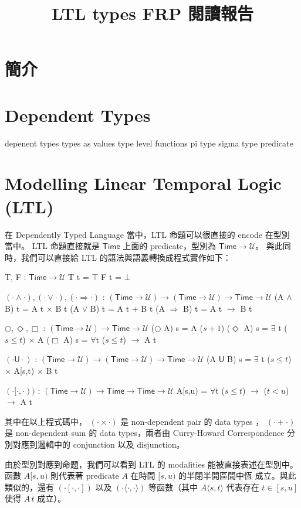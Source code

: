 \documentclass{article}
\newcommand{\Time}{\mathsf{Time}}
\newcommand{\TU}{\mathsf{U}}
\newcommand{\U}{\mathcal{U}}
\begin{document}
\title{LTL types FRP 閱讀報告}
\author{}
\date{}
\maketitle

\section{簡介}
\section{Dependent Types}
  depenent types
  types as values
  type level functions
  pi type
  sigma type
  predicate

\section{Modelling Linear Temporal Logic (LTL)}
  在 Dependently Typed Language 當中，LTL 命題可以很直接的 encode 在型別
  當中。 LTL 命題直接就是 $\Time$ 上面的 predicate，型別為 $\Time\to\U$。
  與此同時，我們可以直接給 LTL 的語法與語義轉換成程式實作如下：

  \begin{code}
  T, F : $\Time\to\U$
  T t = $\top$
  F t = $\bot$

  $(\cdot\land\cdot), (\cdot\lor\cdot), (\cdot\Rightarrow\cdot)$ : $(\Time\to\U)\to(\Time\to\U)\to\Time\to\U$
  (A $\land$ B) t = A t $\times$ B t
  (A $\lor$ B) t = A t + B t
  (A $\Rightarrow$ B) t = A t $\to$ B t

  $\bigcirc,\Diamond,\Box$ : $(\Time\to\U)\to\Time\to\U$
  ($\bigcirc$ A) s = A ($s+1$)
  ($\Diamond$ A) s = $\exists$ {t} ($s\le t$) $\times$ A 
  ($\Box$ A) s = $\forall${t} ($s\le t$) $\to$ A t

  $(\cdot\TU\cdot)$ : $(\Time\to\U)\to(\Time\to\U)\to\Time\to\U$
  (A $\TU$ B) s = $\exists$ {t} ($s\le t$) $\times$ A[s,t) $\times$ B t

  $(\cdot[\cdot,\cdot))$ : $(\Time\to\U)\to\Time\to\Time\to\U$
  A[s,u) = $\forall${t} ($s\le t$) $\to$ ($t<u$) $\to$ A t
  \end{code}

  其中在以上程式碼中， $(\cdot\times\cdot)$ 是 non-dependent pair 的 data types
  ， $(\cdot+\cdot)$ 是 non-dependent sum 的 data types，兩者由 Curry-Howard
  Correspondence 分別對應到邏輯中的 conjunction 以及 disjunction。

  由於型別對應到命題，我們可以看到 LTL 的 modalities 能被直接表述在型別中。
  函數 $A [s,u)$ 則代表著 predicate $A$ 在時間 $[s,u)$ 的半閉半開區間中恆
  成立。與此類似的，還有 $(\cdot[\cdot,\cdot])$ 以及
  $(\cdot\langle\cdot,\cdot\rangle)$ 等函數（其中 $A\langle s,t\rangle$
  代表存在 $t\in [s,u]$ 使得 $A\,t$ 成立）。
\end{document}
